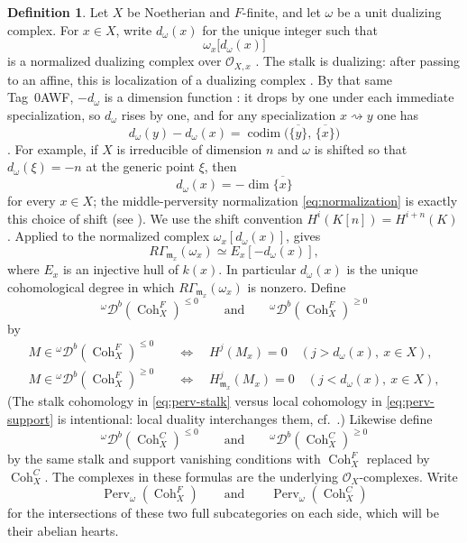 \documentclass[11pt]{amsart}
\newcommand{\cO}{\mathcal{O}}
\newcommand{\Coh}{\operatorname{{Coh}}}
\newcommand{\Db}{\mathcal D^b}
\newcommand{\Perv}{\operatorname{Perv}}
\theoremstyle{plain}
\theoremstyle{definition}
\newtheorem{definition}[definition]{Definition}
\numberwithin{equation}{section}
\begin{document}
\begin{definition}\label{def:dual-perversity}
Let $X$ be Noetherian and $F$-finite, and let $\omega$ be a unit dualizing complex.
For $x\in X$, write $d_\omega(x)$ for the unique integer such that
\[
 \omega_x\bigl[d_\omega(x)\bigr]
\]
is a normalized dualizing complex over $\cO_{X,x}$ \cite[\href{https://stacks.math.columbia.edu/tag/0AWF}{Tag 0AWF}]{SP}.
The stalk is dualizing: after passing to an affine, this is localization of a dualizing complex \cite[\href{https://stacks.math.columbia.edu/tag/0A7G}{Tag 0A7G}]{SP}.
By that same Tag~0AWF, $-d_\omega$ is a dimension function \cite[\href{https://stacks.math.columbia.edu/tag/02I9}{Tag 02I9}]{SP}: it drops by one under each immediate specialization, so $d_\omega$ rises by one, and for any specialization $x\rightsquigarrow y$ one has
\[
 d_\omega(y)-d_\omega(x)
 =\operatorname{codim}\bigl(\overline{\{y\}},\,\overline{\{x\}}\bigr)
\]
\cite[\href{https://stacks.math.columbia.edu/tag/02IA}{Tag 02IA}]{SP}.
For example, if $X$ is irreducible of dimension $n$ and $\omega$ is shifted so that $d_\omega(\xi)=-n$ at the generic point $\xi$, then
\[
 d_\omega(x)=-\dim\overline{\{x\}}
\]
for every $x\in X$; the middle-perversity normalization \eqref{eq:normalization} is exactly this choice of shift (see ).
We use the shift convention $H^i(K[n])=H^{i+n}(K)$.
Applied to the normalized complex $\omega_x[d_\omega(x)]$, \cite[\href{https://stacks.math.columbia.edu/tag/0A82}{Tag 0A82}]{SP} gives
\[
 R\Gamma_{\mathfrak m_x}(\omega_x)\simeq E_x[-d_\omega(x)],
\]
where $E_x$ is an injective hull of $k(x)$.
In particular $d_\omega(x)$ is the unique cohomological degree in which $R\Gamma_{\mathfrak m_x}(\omega_x)$ is nonzero.
Define
\[
 {}^{\omega}\Db(\Coh^F_X)^{\leq0}
 \qquad\text{and}\qquad
 {}^{\omega}\Db(\Coh^F_X)^{\geq0}
\]
by
\begin{align}
 M\in{}^{\omega}\Db(\Coh^F_X)^{\leq0}
 &\quad\Longleftrightarrow\quad H^j(M_x)=0
               \quad(j>d_\omega(x),\ x\in X),\label{eq:perv-stalk}\\
 M\in{}^{\omega}\Db(\Coh^F_X)^{\geq0}
 &\quad\Longleftrightarrow\quad
 H^j_{\mathfrak m_x}(M_x)=0
               \quad(j<d_\omega(x),\ x\in X),\label{eq:perv-support}
\end{align}
(The stalk cohomology in \eqref{eq:perv-stalk} versus local cohomology in \eqref{eq:perv-support} is intentional: local duality interchanges them, cf.\ .)
Likewise define
\[
 {}^{\omega}\Db(\Coh^C_X)^{\leq0}
 \qquad\text{and}\qquad
 {}^{\omega}\Db(\Coh^C_X)^{\geq0}
\]
by the same stalk and support vanishing conditions with $\Coh^F_X$ replaced by $\Coh^C_X$.
The complexes in these formulas are the underlying $\cO_X$-complexes.
Write
\[
 \Perv_\omega(\Coh^F_X)
 \qquad\text{and}\qquad
 \Perv_\omega(\Coh^C_X)
\]
for the intersections of these two full subcategories on each side, which will be their abelian hearts.
\end{definition}
\end{document}
